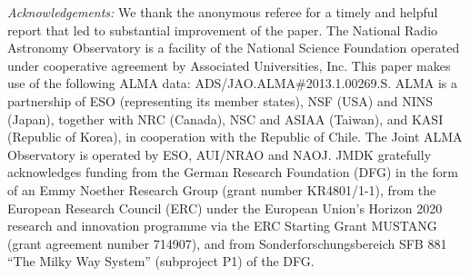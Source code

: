 \documentclass[twocolumn]{aastex62}
\begin{document}
\textit{Acknowledgements:}
We thank the anonymous referee for a timely and helpful report that led to
substantial improvement of the paper.
The National Radio Astronomy Observatory is a facility of the National Science
Foundation operated under cooperative agreement by Associated Universities,
Inc.
This paper makes use of the following ALMA data: ADS/JAO.ALMA\#2013.1.00269.S.
ALMA is a partnership of ESO (representing its member states), NSF (USA) and
NINS (Japan), together with NRC (Canada), NSC and ASIAA (Taiwan), and KASI
(Republic of Korea), in cooperation with the Republic of Chile. The Joint ALMA
Observatory is operated by ESO, AUI/NRAO and NAOJ.
JMDK gratefully acknowledges funding from the German
Research Foundation (DFG) in the form of an Emmy Noether Research Group (grant
number KR4801/1-1), from the European Research Council (ERC) under the European
Union's Horizon 2020 research and innovation programme via the ERC Starting
Grant MUSTANG (grant agreement number 714907), and from Sonderforschungsbereich
SFB 881 ``The Milky Way System'' (subproject P1) of the DFG.



\end{document}
